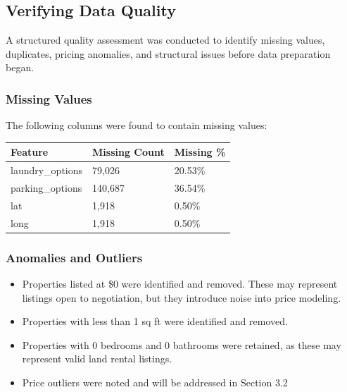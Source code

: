 \newpage

\vspace{15000pt}
  
\subsection{Verifying Data Quality}
\noindent
A structured quality assessment was conducted to identify missing values, duplicates, pricing anomalies, and structural issues before data preparation began.

\subsubsection{Missing Values}
\noindent
The following columns were found to contain missing values:




\begin{table}[H]
    \centering
    \begin{tabular}{||p{3cm}|p{4cm}|p{2cm}||}
    \hline
    \hline
        Feature	& Missing Count & Missing \% \\
        \hline
        \hline
        laundry\_options	& 79,026	& 20.53\% \\
        \hline
        parking\_options	& 140,687	& 36.54\% \\
        \hline
        lat	& 1,918	& 0.50\% \\
        \hline
        long	& 1,918	& 0.50\% \\
        \hline
        \hline
    \end{tabular}
\end{table}


\subsubsection{Anomalies and Outliers}
\vspace{-12pt}
\begin{itemize} [itemsep = -9pt]
    \item Properties listed at \$0 were identified and removed. These may represent listings open to negotiation, but they introduce noise into price modeling.
    \item Properties with less than 1 sq ft were identified and removed.
    \item Properties with 0 bedrooms and 0 bathrooms were retained, as these may represent valid land rental listings.
    \item Price outliers were noted and will be addressed in Section 3.2 %
\end{itemize}




